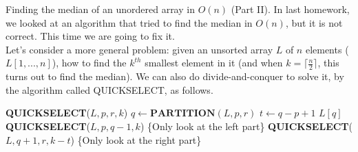 \noindent {} Finding the median of an unordered array in $O(n)$ (Part II). In last homework, we looked at an algorithm that tried to find the median in $O(n)$, but it is not correct. This time we are going to fix it. \\
Let’s consider a more general problem: given an unsorted array $L$ of $n$ elements ($L[1, . . . , n]$), how to
find the $k^{th}$ smallest element in it (and when $k = \lceil \frac{n}{2} \rceil $, this turns out to find the median). We can also
do divide-and-conquer to solve it, by the algorithm called QUICKSELECT, as follows.

\begin{algorithmic}
\State \textbf{QUICKSELECT}($L, p, r, k$)
\State $q \leftarrow \textbf{PARTITION}(L, p, r)$
\State $t \leftarrow q - p + 1$
    \State \Return $L[q]$
    \State \textbf{QUICKSELECT}($L, p, q - 1, k$) \{Only look at the left part\}
\Else
    \State \textbf{QUICKSELECT}($L, q + 1, r, k - t$) \{Only look at the right part\}
\EndIf
\end{algorithmic}


